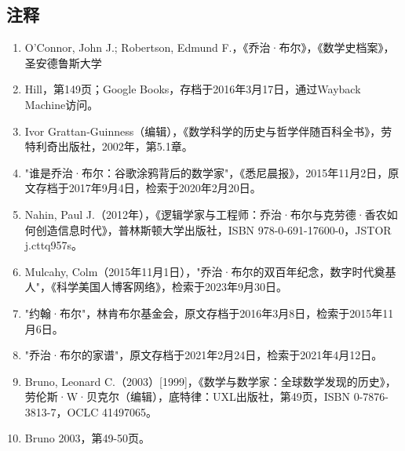 \subsection{注释}  
\begin{enumerate}
\item O'Connor, John J.; Robertson, Edmund F.，《乔治·布尔》，《数学史档案》，圣安德鲁斯大学  
\item Hill，第149页；Google Books，存档于2016年3月17日，通过Wayback Machine访问。  
\item Ivor Grattan-Guinness（编辑），《数学科学的历史与哲学伴随百科全书》，劳特利奇出版社，2002年，第5.1章。  
\item "谁是乔治·布尔：谷歌涂鸦背后的数学家"，《悉尼晨报》，2015年11月2日，原文存档于2017年9月4日，检索于2020年2月20日。  
\item Nahin, Paul J.（2012年），《逻辑学家与工程师：乔治·布尔与克劳德·香农如何创造信息时代》，普林斯顿大学出版社，ISBN 978-0-691-17600-0，JSTOR j.cttq957s。  
\item Mulcahy, Colm（2015年11月1日），"乔治·布尔的双百年纪念，数字时代奠基人"，《科学美国人博客网络》，检索于2023年9月30日。  
\item "约翰·布尔"，林肯布尔基金会，原文存档于2016年3月8日，检索于2015年11月6日。  
\item "乔治·布尔的家谱"，原文存档于2021年2月24日，检索于2021年4月12日。  
\item Bruno, Leonard C.（2003）[1999]，《数学与数学家：全球数学发现的历史》，劳伦斯·W·贝克尔（编辑），底特律：UXL出版社，第49页，ISBN 0-7876-3813-7，OCLC 41497065。  
\item Bruno 2003，第49-50页。
\end{enumerate}